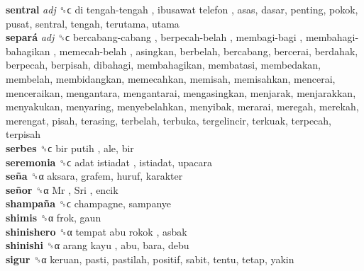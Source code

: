 \textbf{sentral} \emph{adj}  ␝ϲ   di tengah-tengah ,  ibusawat telefon , asas, dasar, penting, pokok, pusat, sentral, tengah, terutama, utama  \\
\textbf{separá} \emph{adj}  ␝ϲ   bercabang-cabang ,  berpecah-belah ,  membagi-bagi ,  membahagi-bahagikan ,  memecah-belah , asingkan, berbelah, bercabang, bercerai, berdahak, berpecah, berpisah, dibahagi, membahagikan, membatasi, membedakan, membelah, membidangkan, memecahkan, memisah, memisahkan, mencerai, menceraikan, mengantara, mengantarai, mengasingkan, menjarak, menjarakkan, menyakukan, menyaring, menyebelahkan, menyibak, merarai, meregah, merekah, merengat, pisah, terasing, terbelah, terbuka, tergelincir, terkuak, terpecah, terpisah  \\
\textbf{serbes} ␝ϲ   bir putih , ale, bir  \\
\textbf{seremonia} ␝ϲ   adat istiadat , istiadat, upacara  \\
\textbf{seña} ␝α  aksara, grafem, huruf, karakter  \\
\textbf{señor} ␝α   Mr ,  Sri , encik  \\
\textbf{shampaña} ␝ϲ  champagne, sampanye  \\
\textbf{shimis} ␝α  frok, gaun  \\
\textbf{shinishero} ␝α   tempat abu rokok , asbak  \\
\textbf{shinishi} ␝α   arang kayu , abu, bara, debu  \\
\textbf{sigur} ␝α  keruan, pasti, pastilah, positif, sabit, tentu, tetap, yakin  \\
